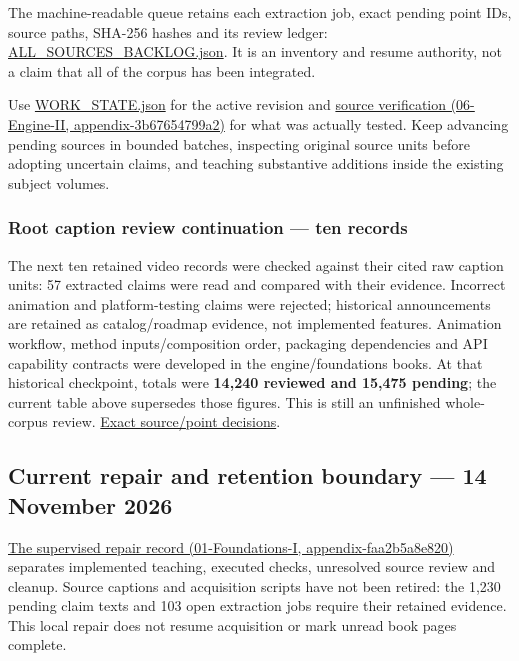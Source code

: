 The machine-readable queue retains each extraction job, exact pending point IDs, source paths, SHA-256 hashes and its review ledger: \hyperref[source-file-77f5d6d48d2587f7e7779921]{ALL\_SOURCES\_BACKLOG.json}. It is an inventory and resume authority, not a claim that all of the corpus has been integrated.

Use \hyperref[source-file-4269beda3a2effefff717ba5]{WORK\_STATE.json} for the active revision and \href{../06-Engine-II/main.pdf\#nameddest=appendix-3b67654799a2}{source verification (06-Engine-II, appendix-3b67654799a2)} for what was actually tested. Keep advancing pending sources in bounded batches, inspecting original source units before adopting uncertain claims, and teaching substantive additions inside the existing subject volumes.

\subsubsection{Root caption review continuation --- ten records}\label{appendix-ac1f51db5e9a-root-caption-review-continuation-ten-records}

The next ten retained video records were checked against their cited raw caption units: 57 extracted claims were read and compared with their evidence. Incorrect animation and platform-testing claims were rejected; historical announcements are retained as catalog/roadmap evidence, not implemented features. Animation workflow, method inputs/composition order, packaging dependencies and API capability contracts were developed in the engine/foundations books. At that historical checkpoint, totals were \textbf{14,240 reviewed and 15,475 pending}; the current table above supersedes those figures. This is still an unfinished whole-corpus review. \hyperref[source-file-02ebf2c2c2c38aae0035fc9f]{Exact source/point decisions}.

\subsection{Current repair and retention boundary --- 14 November 2026}\label{appendix-ac1f51db5e9a-current-repair-and-retention-boundary-14-november-2026}

\href{../01-Foundations-I/main.pdf\#nameddest=appendix-faa2b5a8e820}{The supervised repair record (01-Foundations-I, appendix-faa2b5a8e820)} separates implemented teaching, executed checks, unresolved source review and cleanup. Source captions and acquisition scripts have not been retired: the 1,230 pending claim texts and 103 open extraction jobs require their retained evidence. This local repair does not resume acquisition or mark unread book pages complete.
